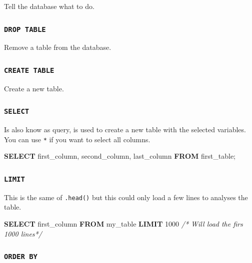 \documentclass[]{book}
\newenvironment{Shaded}{\begin{snugshade}}{\end{snugshade}}
\newcommand{\KeywordTok}[1]{\textcolor[rgb]{0.13,0.29,0.53}{\textbf{#1}}}
\newcommand{\DecValTok}[1]{\textcolor[rgb]{0.00,0.00,0.81}{#1}}
\newcommand{\CommentTok}[1]{\textcolor[rgb]{0.56,0.35,0.01}{\textit{#1}}}
\newcommand{\NormalTok}[1]{#1}
\begin{document}
Tell the database what to do.

\subsubsection{\texorpdfstring{\texttt{DROP\ TABLE}}{DROP TABLE}}\label{drop-table}

Remove a table from the database.

\subsubsection{\texorpdfstring{\texttt{CREATE\ TABLE}}{CREATE TABLE}}\label{create-table}

Create a new table.

\subsubsection{\texorpdfstring{\texttt{SELECT}}{SELECT}}\label{select}

Is also know as query, is used to create a new table with the selected
variables. You can use \texttt{*} if you want to select all columns.

\begin{Shaded}
\begin{Highlighting}[]
\KeywordTok{SELECT}\NormalTok{ first_column, second_column, last_column}
  \KeywordTok{FROM}\NormalTok{ first_table;}
\end{Highlighting}
\end{Shaded}

\subsubsection{\texorpdfstring{\texttt{LIMIT}}{LIMIT}}\label{limit}

This is the same of \texttt{.head()} but this could only load a few
lines to analyses the table.

\begin{Shaded}
\begin{Highlighting}[]
\KeywordTok{SELECT}\NormalTok{ first_column}
  \KeywordTok{FROM}\NormalTok{ my_table}
\KeywordTok{LIMIT} \DecValTok{1000}            \CommentTok{/* Will load the firs 1000 lines*/}
\end{Highlighting}
\end{Shaded}

\subsubsection{\texorpdfstring{\texttt{ORDER\ BY}}{ORDER BY}}\label{order-by}
\end{document}
